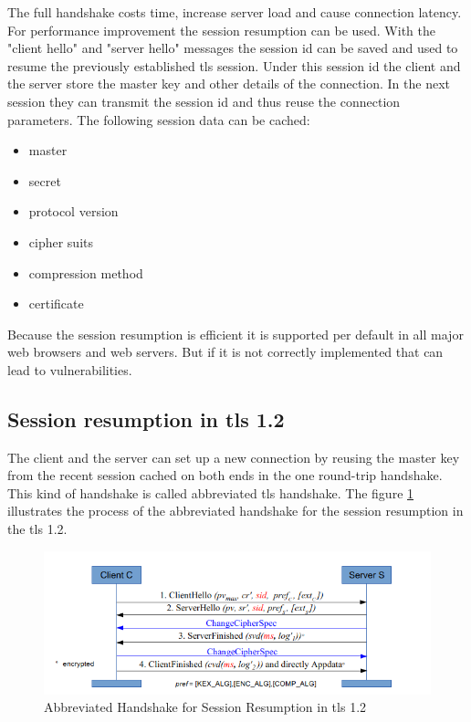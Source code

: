 The full handshake costs time, increase server load and cause connection latency. For performance improvement the session resumption can be used. With the "client hello" and "server hello" messages the session id can be saved and used to resume the previously established \gls{tls} session. Under this session id the client and the server store the master key and other details of the connection. In the next session they can transmit the session id and thus reuse the connection parameters. The following session data can be cached:
\begin{itemize}
\item master 
\item secret
\item protocol version
\item cipher suits
\item compression method
\item certificate
\end{itemize}
Because the session resumption is efficient it is supported per default in all major web browsers and web servers. But if it is not correctly implemented that can lead to vulnerabilities.

\subsection{Session resumption in \gls{tls} 1.2}
\label{subsec:resumption1_2}

The client and the server can set up a new connection by reusing the master key from the recent session cached on both ends in the one round-trip handshake. This kind of handshake is called abbreviated \gls{tls} handshake. The figure \ref{fig:resumption1_2} illustrates the process of the abbreviated handshake for the session resumption in the \gls{tls} 1.2.

\begin{figure}[H]
	\centering
		\includegraphics[scale=0.85]{images/resumption1_2.png}
	\caption{Abbreviated Handshake for Session Resumption in \gls{tls} 1.2 \cite{Hassenstein}}
	\label{fig:resumption1_2}
\end{figure}

